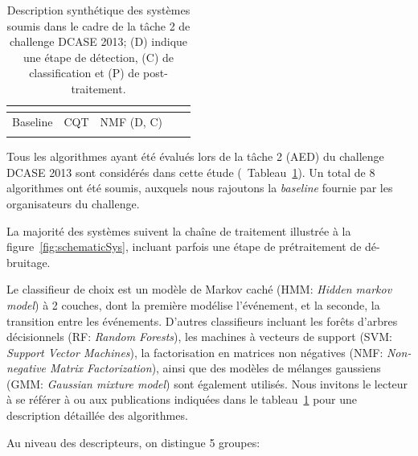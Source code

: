 \begin{table}[t]
\begin{center}
\begin{tabular}{lcccc}
\citep{VVK,gemmeke2013exemplar}     &                      &                              &           &             \\    
\hline
Baseline                            & CQT                  & NMF \hfill  (D, C)           &           &             \\ 
\citep{Giannoulis:2013a}            &                      &                              &           &             \\  
\hline      
\end{tabular}
\end{center}
\caption[Description synthétique des systèmes soumis dans le cadre de la tâche 2 de challenge DCASE 2013.]{Description synthétique des systèmes soumis dans le cadre de la tâche 2 de challenge DCASE 2013; (D) indique une étape de détection, (C) de classification et (P) de post-traitement.}
\label{tab:systemsDcase2013}
\end{table}

Tous les algorithmes ayant été évalués lors de la tâche 2 (AED) du challenge DCASE 2013 sont considérés dans cette étude (\cf~Tableau~\ref{tab:systemsDcase2013}). Un total de 8 algorithmes ont été soumis, auxquels nous rajoutons la \emph{baseline} fournie par les organisateurs du challenge.

La majorité des systèmes suivent la chaîne de traitement illustrée à la figure~\ref{fig:schematicSys}, incluant parfois une étape de prétraitement de dé-bruitage.

Le classifieur de choix est un modèle de Markov caché (HMM: \emph{Hidden markov model}) \citep{Rabiner1989} à 2 couches, dont la première modélise l'événement, et la seconde, la transition entre les événements. D'autres classifieurs incluant les forêts d'arbres décisionnels (RF: \emph{Random Forests}), les machines à vecteurs de support (SVM: \emph{Support Vector Machines}), la factorisation en matrices non négatives (NMF: \emph{Non-negative Matrix Factorization}), ainsi que des modèles de mélanges gaussiens (GMM: \emph{Gaussian mixture model}) sont également utilisés. Nous invitons le lecteur à se référer à \citep{Stowell15} ou aux publications indiquées dans le tableau~\ref{tab:systemsDcase2013} pour une description détaillée des algorithmes.

Au niveau des descripteurs, on distingue 5 groupes:

